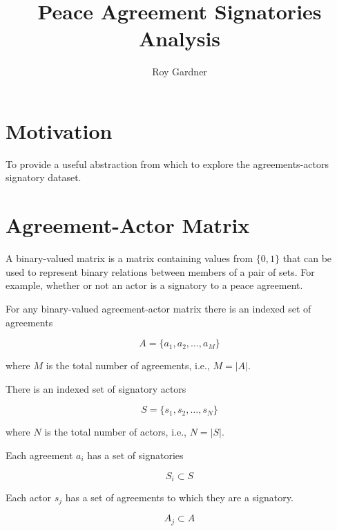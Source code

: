 \documentclass{article}
\title{Peace Agreement Signatories Analysis}
\author{Roy Gardner}
\begin{document}

\maketitle

\tableofcontents
\newpage

\section{Motivation}

To provide a useful abstraction from which to explore the agreements-actors signatory dataset.

\section{Agreement-Actor Matrix}

A binary-valued matrix is a matrix containing values from $\{0,1\}$ that can be used to represent binary relations between members of a pair of sets. For example, whether or not an actor is a signatory to a peace agreement.\newline

For any binary-valued agreement-actor matrix there is an indexed set of agreements 

\begin{equation}
A=\{a_1,a_2,…,a_M\}
\end{equation}

where $M$ is the total number of agreements, i.e., $M=|A|$.\newline

There is an indexed set of signatory actors

\begin{equation}
S=\{s_1,s_2,…,s_N\} 
\end{equation}

where $N$ is the total number of actors, i.e., $N=|S|$.\newline

Each agreement $a_i$ has a set of signatories 

\begin{equation}
S_{i}\subset S
\end{equation}

Each actor $s_j$ has a set of agreements to which they are a signatory.

\begin{equation}
A_{j}\subset A
\end{equation}
\end{document}
